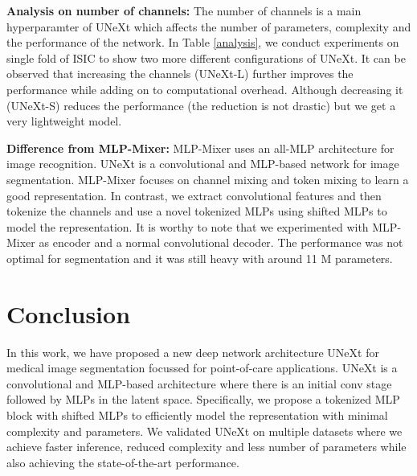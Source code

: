 \documentclass[runningheads]{llncs}
\begin{document}
\noindent \textbf{Analysis on number of channels:} The number of channels is a main hyperparamter of UNeXt which affects the number of parameters, complexity and the performance of the network. In Table \ref{analysis}, we conduct experiments on single fold of ISIC to show two more different configurations of UNeXt. It can be observed that increasing the channels (UNeXt-L) further improves the performance while adding on to computational overhead. Although decreasing it (UNeXt-S) reduces the performance (the reduction is not drastic) but we get a very lightweight model.

\begin{table}[]
\centering
\caption{Analysis on the number of channels.}
\label{analysis}

\end{table}





\noindent \textbf{Difference from MLP-Mixer:} MLP-Mixer uses an all-MLP architecture for image recognition. UNeXt is a convolutional and MLP-based network for image segmentation. MLP-Mixer focuses on channel mixing and token mixing to learn a good representation. In contrast, we extract convolutional features and then tokenize the channels and use a novel tokenized MLPs using shifted MLPs to model the representation. It is worthy to note that we experimented with MLP-Mixer as encoder and a normal convolutional decoder. The performance was not optimal for segmentation and it was still heavy with  around 11 M parameters.


\section{Conclusion}



In this work, we have proposed a new deep network architecture UNeXt for medical image segmentation focussed for point-of-care applications. UNeXt is a convolutional and MLP-based architecture where there is an initial conv stage followed by MLPs in the latent space. Specifically, we propose a tokenized MLP block with shifted MLPs to efficiently model the representation with minimal complexity and parameters. We validated UNeXt on multiple datasets where we achieve faster inference, reduced complexity and less number of parameters while also achieving the state-of-the-art performance.






	
\end{document}

